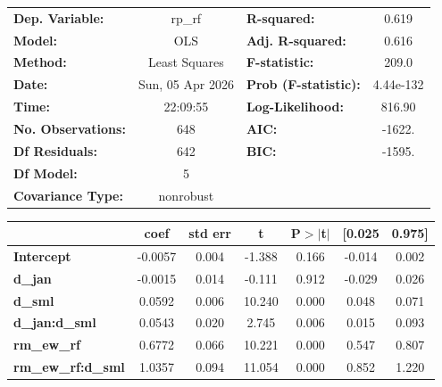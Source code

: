 \begin{center}
\begin{tabular}{lclc}
\toprule
\textbf{Dep. Variable:}    &      rp\_rf      & \textbf{  R-squared:         } &     0.619   \\
\textbf{Model:}            &       OLS        & \textbf{  Adj. R-squared:    } &     0.616   \\
\textbf{Method:}           &  Least Squares   & \textbf{  F-statistic:       } &     209.0   \\
\textbf{Date:}             & Sun, 05 Apr 2026 & \textbf{  Prob (F-statistic):} & 4.44e-132   \\
\textbf{Time:}             &     22:09:55     & \textbf{  Log-Likelihood:    } &    816.90   \\
\textbf{No. Observations:} &         648      & \textbf{  AIC:               } &    -1622.   \\
\textbf{Df Residuals:}     &         642      & \textbf{  BIC:               } &    -1595.   \\
\textbf{Df Model:}         &           5      & \textbf{                     } &             \\
\textbf{Covariance Type:}  &    nonrobust     & \textbf{                     } &             \\
\bottomrule
\end{tabular}
\begin{tabular}{lcccccc}
                           & \textbf{coef} & \textbf{std err} & \textbf{t} & \textbf{P$> |$t$|$} & \textbf{[0.025} & \textbf{0.975]}  \\
\midrule
\textbf{Intercept}         &      -0.0057  &        0.004     &    -1.388  &         0.166        &       -0.014    &        0.002     \\
\textbf{d\_jan}            &      -0.0015  &        0.014     &    -0.111  &         0.912        &       -0.029    &        0.026     \\
\textbf{d\_sml}            &       0.0592  &        0.006     &    10.240  &         0.000        &        0.048    &        0.071     \\
\textbf{d\_jan:d\_sml}     &       0.0543  &        0.020     &     2.745  &         0.006        &        0.015    &        0.093     \\
\textbf{rm\_ew\_rf}        &       0.6772  &        0.066     &    10.221  &         0.000        &        0.547    &        0.807     \\
\textbf{rm\_ew\_rf:d\_sml} &       1.0357  &        0.094     &    11.054  &         0.000        &        0.852    &        1.220     \\

\end{tabular}
\end{center}
